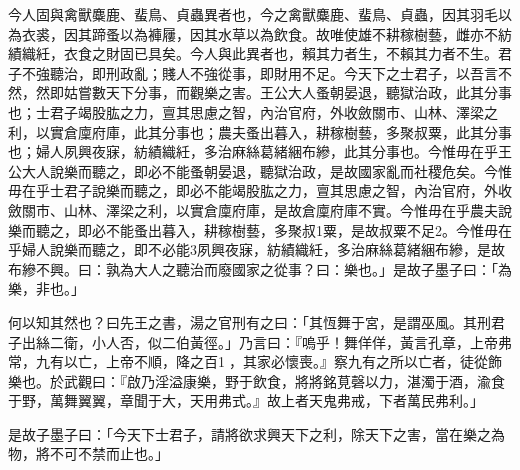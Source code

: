 \begin{pinyinscope}
今人固與禽獸麋鹿、蜚鳥、貞蟲異者也，今之禽獸麋鹿、蜚鳥、貞蟲，因其羽毛以為衣裘，因其蹄蚤以為褲屨，因其水草以為飲食。故唯使雄不耕稼樹藝，雌亦不紡績織紝，衣食之財固已具矣。今人與此異者也，賴其力者生，不賴其力者不生。君子不強聽治，即刑政亂；賤人不強從事，即財用不足。今天下之士君子，以吾言不然，然即姑嘗數天下分事，而觀樂之害。王公大人蚤朝晏退，聽獄治政，此其分事也；士君子竭股肱之力，亶其思慮之智，內治官府，外收斂關市、山林、澤梁之利，以實倉廩府庫，此其分事也；農夫蚤出暮入，耕稼樹藝，多聚叔粟，此其分事也；婦人夙興夜寐，紡績織紝，多治麻絲葛緒綑布縿，此其分事也。今惟毋在乎王公大人說樂而聽之，即必不能蚤朝晏退，聽獄治政，是故國家亂而社稷危矣。今惟毋在乎士君子說樂而聽之，即必不能竭股肱之力，亶其思慮之智，內治官府，外收斂關市、山林、澤梁之利，以實倉廩府庫，是故倉廩府庫不實。今惟毋在乎農夫說樂而聽之，即必不能蚤出暮入，耕稼樹藝，多聚叔1粟，是故叔粟不足2。今惟毋在乎婦人說樂而聽之，即不必能3夙興夜寐，紡績織紝，多治麻絲葛緒綑布縿，是故布縿不興。曰：孰為大人之聽治而廢國家之從事？曰：樂也。」是故子墨子曰：「為樂，非也。」

何以知其然也？曰先王之書，湯之官刑有之曰：「其恆舞于宮，是謂巫風。其刑君子出絲二衛，小人否，似二伯黃徑。」乃言曰：『嗚乎！舞佯佯，黃言孔章，上帝弗常，九有以亡，上帝不順，降之百1𦍙，其家必懷喪。』察九有之所以亡者，徒從飾樂也。於武觀曰：『啟乃淫溢康樂，野于飲食，將將銘莧磬以力，湛濁于酒，渝食于野，萬舞翼翼，章聞于大，天用弗式。』故上者天鬼弗戒，下者萬民弗利。」

是故子墨子曰：「今天下士君子，請將欲求興天下之利，除天下之害，當在樂之為物，將不可不禁而止也。」


\end{pinyinscope}